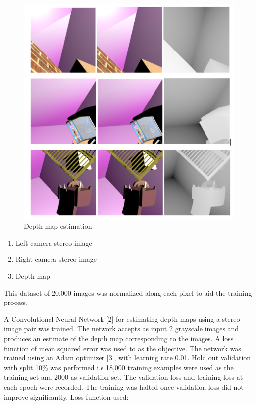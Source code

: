 \begin{figure}
  \includegraphics[width=\linewidth]{images/depthmap1.png}
  \caption{Depth map estimation}
  \label{fig:boat1}
\end{figure}

\begin{enumerate}
\item Left camera stereo image
\item Right camera stereo image
\item Depth map
\end{enumerate}
This dataset of 20,000 images was normalized along each pixel to aid the training process.

A Convolutional Neural Network [2] for estimating depth maps using a stereo image pair was trained. The network accepts as input 2 grayscale images and produces an estimate of the depth map corresponding to the images. 
A loss function of mean squared error was used to as the objective. The network was trained using an Adam optimizer [3], with learning rate 0.01. Hold out validation with split 10\%  was performed i.e 18,000 training examples were used as the training set and 2000 as validation set. The validation loss and training loss at each epoch were recorded. The training was halted once validation loss did not improve significantly.
Loss function used:

